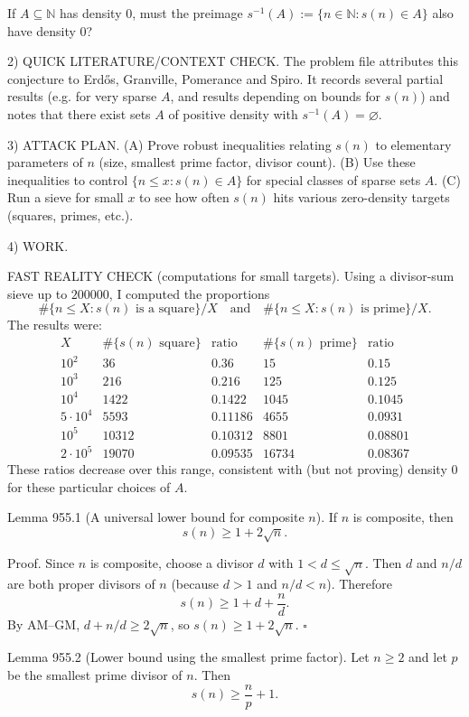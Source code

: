 If $A\subseteq\mathbb{N}$ has density $0$, must the preimage
$s^{-1}(A):=\{n\in\mathbb{N}: s(n)\in A\}$ also have density $0$?

2) QUICK LITERATURE/CONTEXT CHECK.
The problem file attributes this conjecture to Erd\H{o}s, Granville, Pomerance and Spiro.
It records several partial results (e.g. for very sparse $A$, and results depending on bounds for $s(n)$) and notes that there exist sets $A$ of positive density with $s^{-1}(A)=\varnothing$.

3) ATTACK PLAN.
(A) Prove robust inequalities relating $s(n)$ to elementary parameters of $n$ (size, smallest prime factor, divisor count).
(B) Use these inequalities to control $\{n\le x: s(n)\in A\}$ for special classes of sparse sets $A$.
(C) Run a sieve for small $x$ to see how often $s(n)$ hits various zero-density targets (squares, primes, etc.).

4) WORK.

FAST REALITY CHECK (computations for small targets).
Using a divisor-sum sieve up to $200000$, I computed the proportions
\[\#\{n\le X: s(n)\text{ is a square}\}/X\quad\text{and}\quad \#\{n\le X: s(n)\text{ is prime}\}/X.\]
The results were:
\[
\begin{array}{c|c|c||c|c}
X & \#\{s(n)\text{ square}\} & \text{ratio} & \#\{s(n)\text{ prime}\} & \text{ratio}\\\hline
10^2 & 36 & 0.36 & 15 & 0.15\\
10^3 & 216 & 0.216 & 125 & 0.125\\
10^4 & 1422 & 0.1422 & 1045 & 0.1045\\
5\cdot 10^4 & 5593 & 0.11186 & 4655 & 0.0931\\
10^5 & 10312 & 0.10312 & 8801 & 0.08801\\
2\cdot 10^5 & 19070 & 0.09535 & 16734 & 0.08367
\end{array}
\]
These ratios decrease over this range, consistent with (but not proving) density $0$ for these particular choices of $A$.

Lemma 955.1 (A universal lower bound for composite $n$).
If $n$ is composite, then
\[
 s(n)\ge 1+2\sqrt{n}.
\]

Proof.
Since $n$ is composite, choose a divisor $d$ with $1<d\le \sqrt{n}$.
Then $d$ and $n/d$ are both proper divisors of $n$ (because $d>1$ and $n/d<n$).
Therefore
\[
 s(n)\ge 1 + d + \frac{n}{d}.
\]
By AM--GM, $d + n/d \ge 2\sqrt{n}$, so $s(n)\ge 1+2\sqrt{n}$.
\hfill $\square$

Lemma 955.2 (Lower bound using the smallest prime factor).
Let $n\ge 2$ and let $p$ be the smallest prime divisor of $n$.
Then
\[
 s(n)\ge \frac{n}{p}+1.
\]

